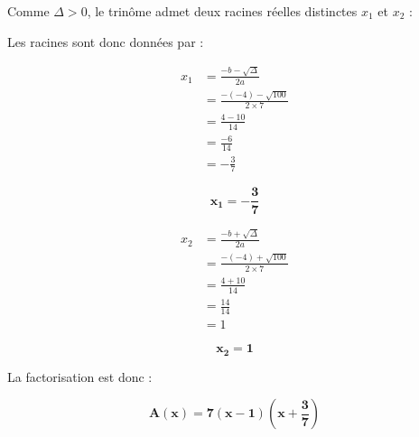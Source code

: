 \documentclass[a4paper,12pt]{article}
\begin{document}
\begin{enumerate}
Comme \(\Delta > 0\), le trinôme admet deux racines réelles distinctes \( x_1 \) et \( x_2 \) :

Les racines sont donc données par :

\[
\begin{aligned}
        x_1 &= \frac{-b - \sqrt{\Delta}}{2a} \\
            &= \frac{-(-4) - \sqrt{100}}{2 \times 7} \\
            &= \frac{4 - 10}{14} \\
            &= \frac{-6}{14} \\
            &= -\frac{3}{7}
\end{aligned}
\]

\begin{resultbox}
    \[
    \mathbf{x_1 = -\frac{3}{7}}
    \]
\end{resultbox}

\[
\begin{aligned}
        x_2 &= \frac{-b + \sqrt{\Delta}}{2a} \\
            &= \frac{-(-4) + \sqrt{100}}{2 \times 7} \\
            &= \frac{4 + 10}{14} \\
            &= \frac{14}{14} \\
            &= 1
\end{aligned}
\]

\begin{resultbox}
    \[
    \mathbf{x_2 = 1}
    \]
\end{resultbox}

La factorisation est donc :

\begin{resultbox}
    \[
    \mathbf{A(x) = 7 \left( x - 1 \right) \left( x + \frac{3}{7} \right)}
    \]
\end{resultbox}
\end{enumerate}
\end{document}
